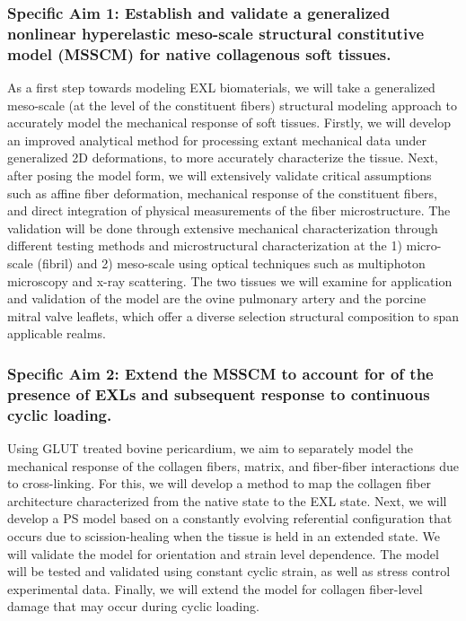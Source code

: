     \subsubsection*{Specific Aim 1: Establish and validate a generalized nonlinear hyperelastic meso-scale structural constitutive model (MSSCM) for native collagenous soft tissues.} As a first step towards modeling EXL biomaterials, we will take a generalized meso-scale (at the level of the constituent fibers) structural modeling approach to accurately model the mechanical response of soft tissues. Firstly, we will develop an improved analytical method for processing extant mechanical data under generalized 2D deformations, to more accurately characterize the tissue. Next, after posing the model form, we will extensively validate critical assumptions such as affine fiber deformation, mechanical response of the constituent fibers, and direct integration of physical measurements of the fiber microstructure. The validation will be done through extensive mechanical characterization through different testing methods and microstructural characterization at the 1) micro-scale (fibril) and 2) meso-scale using optical techniques such as multiphoton microscopy and x-ray scattering. The two tissues we will examine for application and validation of the model are the ovine pulmonary artery and the porcine mitral valve leaflets, which offer a diverse selection structural composition to span applicable realms.
    


    \subsubsection*{Specific Aim 2: Extend the MSSCM to account for of the presence of EXLs and subsequent response to continuous cyclic loading.} Using GLUT treated bovine pericardium, we aim to separately model the mechanical response of the collagen fibers, matrix, and fiber-fiber interactions due to cross-linking. For this, we will develop a method to map the collagen fiber architecture characterized from the native state to the EXL state. Next, we will develop a PS model based on a constantly evolving referential configuration that occurs due to scission-healing when the tissue is held in an extended state. We will validate the model for orientation and strain level dependence. The model will be tested and validated using constant cyclic strain, as well as stress control experimental data. Finally, we will extend the model for collagen fiber-level damage that may occur during cyclic loading. 
    
